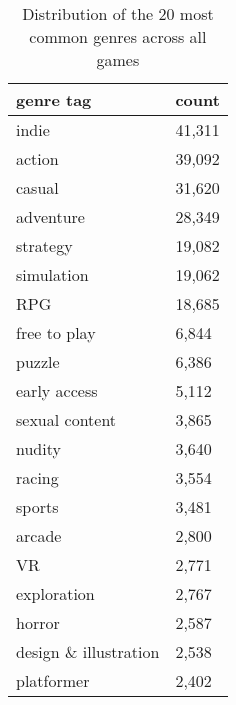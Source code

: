 \begin{table}[h]
    \centering
    \begin{tabular}{l|l}
    genre tag & count\\\hline
        indie & 41,311 \\
        action & 39,092 \\
        casual & 31,620 \\
        adventure & 28,349 \\
        strategy & 19,082 \\
        simulation & 19,062 \\
        RPG & 18,685 \\
        free to play & 6,844 \\
        puzzle & 6,386 \\
        early access & 5,112 \\
        sexual content & 3,865 \\
        nudity & 3,640 \\
        racing & 3,554 \\
        sports & 3,481 \\
        arcade & 2,800 \\
        VR & 2,771 \\
        exploration & 2,767 \\
        horror & 2,587 \\
        design \& illustration & 2,538 \\
        platformer & 2,402
    \end{tabular}
    \caption{Distribution of the 20 most common genres across all games}
    \label{tab:genre_metrics}
\end{table}